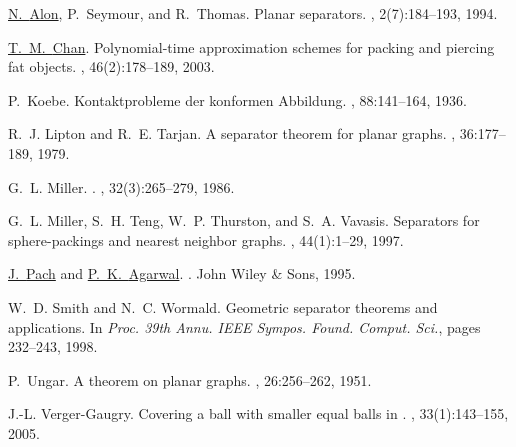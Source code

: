 \documentclass[12pt]{article}
\theoremstyle{remark}\theoremheaderfont{\sf}\theorembodyfont{\upshape}\newtheorem{defn}[theorem]{Definition}
\begin{document}
\begin{thebibliography}{MTTV97}

\href{http://www.math.tau.ac.il/~nogaa/}{N.~{Alon}}, P.~Seymour, and R.~Thomas.
\newblock Planar separators.
, 2(7):184--193, 1994.

\href{http://www.math.uwaterloo.ca/~tmchan/}{T.~M.~{Chan}}.
\newblock Polynomial-time approximation schemes for packing and piercing fat
  objects.
, 46(2):178--189, 2003.

P.~Koebe.
\newblock Kontaktprobleme der konformen {Abbildung}.
, 88:141--164, 1936.

R.~J. Lipton and R.~E. Tarjan.
\newblock A separator theorem for planar graphs.
, 36:177--189, 1979.

G.~L. Miller.
.
, 32(3):265--279, 1986.

G.~L. Miller, S.~H. Teng, W.~P. Thurston, and S.~A. Vavasis.
\newblock Separators for sphere-packings and nearest neighbor graphs.
, 44(1):1--29, 1997.

\href{http://www.math.nyu.edu/~pach}{J.~{Pach}} and \href{http://www.cs.duke.edu/~pankaj}{P.~K.~{Agarwal}}.
.
\newblock John Wiley \& Sons, 1995.

W.~D. Smith and N.~C. Wormald.
\newblock Geometric separator theorems and applications.
\newblock In {\em Proc. 39th Annu. IEEE Sympos. Found. Comput. Sci.\CNFFOCS},
  pages 232--243, 1998.

P.~Ungar.
\newblock A theorem on planar graphs.
, 26:256--262, 1951.

J.-L. {Verger-Gaugry}.
\newblock Covering a ball with smaller equal balls in {}.
, 33(1):143--155, 2005.

\end{thebibliography}
\end{document}
